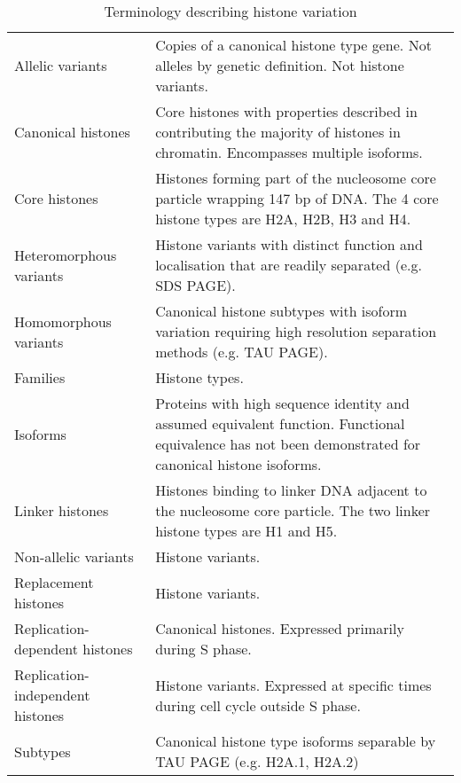   \begin{table*}
    \caption{Terminology describing histone variation}
    \label{tab:histone-divisions}
    \centering
    \begin{tabular}{F p{\dimexpr(\textwidth--4\tabcolsep)}}
      \toprule
	  Allelic variants &
	  Copies of a canonical histone type gene. Not alleles by genetic definition. Not histone variants. 
	  \\
      \addlinespace
	  Canonical histones &
	  Core histones with properties described in  
	  contributing the majority of histones in chromatin.
	  Encompasses multiple isoforms.
	  \\
      \addlinespace
	  Core histones &
	  Histones forming part of the nucleosome core particle wrapping 147 bp of DNA.
	  The 4 core histone types are H2A, H2B, H3 and H4.
	  \\
      \addlinespace
	  Heteromorphous variants &
	  Histone variants with distinct function and localisation that are readily separated (e.g. SDS PAGE).
	  \\
      \addlinespace
	  Homomorphous variants &
	  Canonical histone subtypes with isoform variation 
	  requiring high resolution separation methods (e.g. TAU PAGE).
	  \\
      \addlinespace
	  Families &
	  Histone types.
	  \\
      \addlinespace
	  Isoforms &
	  Proteins with high sequence identity and assumed equivalent function. 
	  Functional equivalence has not been demonstrated for canonical histone isoforms.
	  \\
      \addlinespace
	  Linker histones &
	  Histones binding to linker DNA adjacent to the nucleosome core particle.
	  The two linker histone types are H1 and H5.
	  \\
      \addlinespace
	  Non-allelic variants &
	  Histone variants. \\
      \addlinespace
      Replacement histones &
	  Histone variants. \\
      \addlinespace
	  Replication-dependent histones &
	  Canonical histones. Expressed primarily during S phase. \\
      \addlinespace
	  Replication-independent histones &
	  Histone variants. Expressed at specific times during cell cycle outside S phase. \\
      \addlinespace
	  Subtypes &
	  Canonical histone type isoforms separable by TAU PAGE 
	  (e.g. H2A.1, H2A.2)
	  \\

\end{tabular}
\end{table*}
